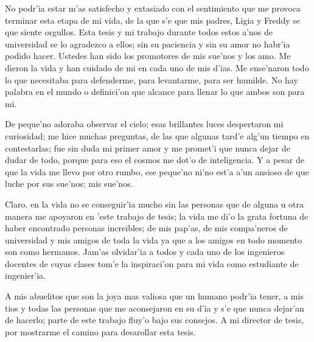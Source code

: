 

No podr'ia estar m'as satisfecho y extasiado con el sentimiento que me provoca terminar esta etapa de mi vida, de la que s'e que mis padres, Ligia y Freddy se que siente orgullos. Esta tesis y mi trabajo durante todos estos a'nos de universidad se lo agradezco a ellos; sin su paciencia y sin su amor no habr'ia podido hacer. Ustedes han sido los promotores de mis sue'nos y los amo. Me dieron la vida y han cuidado de mi en cada uno de mis d'ias. Me ense'naron todo lo que necesitaba para defenderme, para levantarme, para ser humilde. No hay palabra en el mundo o definici'on que alcance para llenar lo que ambos son para mi. 

De peque'no adoraba observar el cielo; esas brillantes luces despertaron mi curiosidad; me hice muchas preguntas, de las que algunas tard'e alg'un tiempo en contestarlas; fue sin duda mi primer amor y me promet'i que nunca dejar de dudar de todo, porque para eso el cosmos me dot'o de inteligencia. Y a pesar de que la vida me llevo por otro rumbo, ese peque'no ni'no est'a a'un ansioso de que luche por sus sue'nos; mis sue'nos. 

Claro, en la vida no se conseguir'ia mucho sin las personas que de alguna u otra manera me apoyaron en 'este trabajo de tesis; la vida me di'o la grata fortuna de haber encontrado personas increibles; de mis pap'as, de mis compa'neros de universidad y mis amigos de toda la vida ya que a los amigos en todo momento son como hermanos. Jam'as olvidar'ia a todos y cada uno de los ingenieros docentes de cuyas clases tom'e la inspiraci'on para mi vida como estudiante de ingenier'ia.


A mis abuelitos que son la joya mas valiosa que un humano podr'ia tener, a mis tios y todas las personas que me aconsejaron en su d'ia y s'e que nunca dejar'an de hacerlo; parte de este trabajo fluy'o bajo sus consejos. A mi director de tesis, por mostrarme el camino para desarollar esta tesis.

